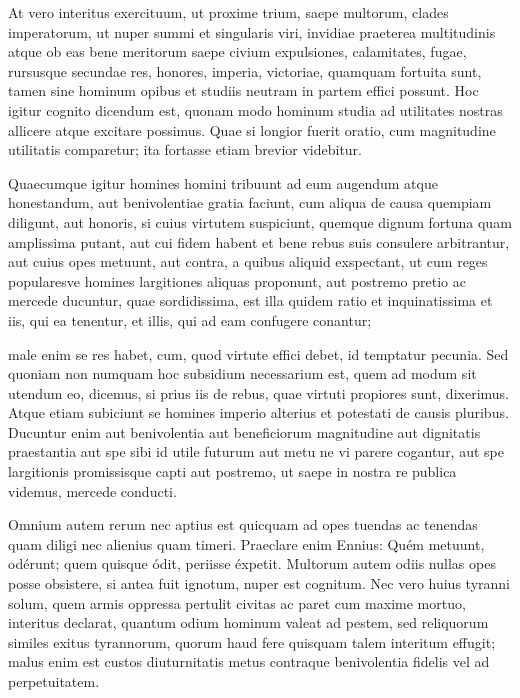  At vero interitus exercituum, ut proxime trium, saepe multorum, clades imperatorum, ut nuper summi et singularis viri, invidiae praeterea multitudinis atque ob eas bene meritorum saepe civium expulsiones, calamitates, fugae, rursusque secundae res, honores, imperia, victoriae, quamquam fortuita sunt, tamen sine hominum opibus et studiis neutram in partem effici possunt. Hoc igitur cognito dicendum est, quonam modo hominum studia ad utilitates nostras allicere atque excitare possimus. Quae si longior fuerit oratio, cum magnitudine utilitatis comparetur; ita fortasse etiam brevior videbitur.

 Quaecumque igitur homines homini tribuunt ad eum augendum atque honestandum, aut benivolentiae gratia faciunt, cum aliqua de causa quempiam diligunt, aut honoris, si cuius virtutem suspiciunt, quemque dignum fortuna quam amplissima putant, aut cui fidem habent et bene rebus suis consulere arbitrantur, aut cuius opes metuunt, aut contra, a quibus aliquid exspectant, ut cum reges popularesve homines largitiones aliquas proponunt, aut postremo pretio ac mercede ducuntur, quae sordidissima, est illa quidem ratio et inquinatissima et iis, qui ea tenentur, et illis, qui ad eam confugere conantur;

 male enim se res habet, cum, quod virtute effici debet, id temptatur pecunia. Sed quoniam non numquam hoc subsidium necessarium est, quem ad modum sit utendum eo, dicemus, si prius iis de rebus, quae virtuti propiores sunt, dixerimus. Atque etiam subiciunt se homines imperio alterius et potestati de causis pluribus. Ducuntur enim aut benivolentia aut beneficiorum magnitudine aut dignitatis praestantia aut spe sibi id utile futurum aut metu ne vi parere cogantur, aut spe largitionis promissisque capti aut postremo, ut saepe in nostra re publica videmus, mercede conducti.

 Omnium autem rerum nec aptius est quicquam ad opes tuendas ac tenendas quam diligi nec alienius quam timeri. Praeclare enim Ennius: Quém metuunt, odérunt; quem quisque ódit, periisse éxpetit. Multorum autem odiis nullas opes posse obsistere, si antea fuit ignotum, nuper est cognitum. Nec vero huius tyranni solum, quem armis oppressa pertulit civitas ac paret cum maxime mortuo, interitus declarat, quantum odium hominum valeat ad pestem, sed reliquorum similes exitus tyrannorum, quorum haud fere quisquam talem interitum effugit; malus enim est custos diuturnitatis metus contraque benivolentia fidelis vel ad perpetuitatem.

